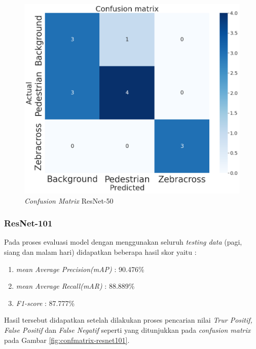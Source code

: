 \begin{figure}[H]
	\centering
	\includegraphics[scale=0.3]{gambar/confmatrix/resnet50_confmat.png}
	\caption{\textit{Confusion Matrix} ResNet-50}
	\label{fig:confmatrix-resnet50}
\end{figure}

\subsubsection{ResNet-101}

Pada proses evaluasi model dengan menggunakan seluruh \textit{testing data} (pagi, siang dan malam hari) didapatkan beberapa hasil skor yaitu :
\begin{enumerate}[nolistsep]
	\item \textit{mean Average Precision(mAP)} : 90.476\%
	\item \textit{mean Average Recall(mAR)} : 88.889\%
	\item \textit{F1-score} : 87.777\%
\end{enumerate}
Hasil tersebut didapatkan setelah dilakukan proses pencarian nilai \textit{Trur Positif, False Positif} dan \textit{False Negatif} seperti yang ditunjukkan pada \textit{confusion matrix} pada Gambar \ref{fig:confmatrix-resnet101}.

